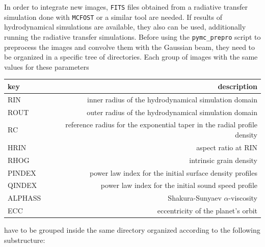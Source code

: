 \documentclass[a4paper,10pt]{report}
\begin{document}
In order to integrate new images, \lstinline{FITS} files obtained from a radiative 
transfer simulation done with \lstinline{MCFOST} or a similar tool are needed. If results of hydrodynamical 
simulations are available, they also can be used, additionally running the radiative transfer simulations.
Before using the \lstinline{pymc_prepro} script to preprocess the images and convolve them with the Gaussian beam,
they need to be organized in a specific tree of directories.
Each group of images with the same values for these parameters

\begin{center}
    \begin{tabular}{lr}
        \toprule
        key & description \\
        \midrule
        RIN & inner radius of the hydrodynamical simulation domain \\
        ROUT & outer radius of the hydrodynamical simulation domain\\
        RC & reference radius for the exponential taper in the radial profile density\\ 
        HRIN & aspect ratio at RIN \\ 
        RHOG & intrinsic grain density\\ 
        PINDEX & power law index for the initial surface density profiles\\
        QINDEX & power law index for the initial sound speed profile \\
        ALPHASS & Shakura-Sunyaev $\alpha$-viscosity\\
        ECC & eccentricity of the planet's orbit\\
        \bottomrule        
    \end{tabular}
\end{center}

have to be grouped inside the same directory organized according to the following substructure:

\end{document}

